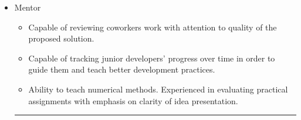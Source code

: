 \documentclass[a4paper]{article}
\begin{document}
\begin{itemize}
\begin{itemize}
    \item Skilled in defining interfaces that involve multiple technologies (e.g., backend-to-mobile communication).
    \item Capable of designing software flows based on HTTP resources.
    \item General knowledge of data persistence technologies (\texttt{PostgreSQL}, \texttt{Redis}).
    \item Conscious and effective use of \texttt{git} in development workflows.
    \item General understanding of \texttt{Unix} systems.
    \item Effective usage of AI agents (e.g. \texttt{claude-code}) to accelerate development processes.
  \end{itemize}

  \item Mentor
  \begin{itemize}
    \item Capable of reviewing coworkers work with attention to quality of the proposed solution.
    \item Capable of tracking junior developers’ progress over time in order to guide them and teach better development practices.
    \item Ability to teach numerical methods. Experienced in evaluating practical assignments with emphasis on clarity of idea presentation.
  \end{itemize}

\vspace{1em}
\noindent\rule{\linewidth}{0.4pt}
\vspace{1em}


\end{itemize}
\end{document}

